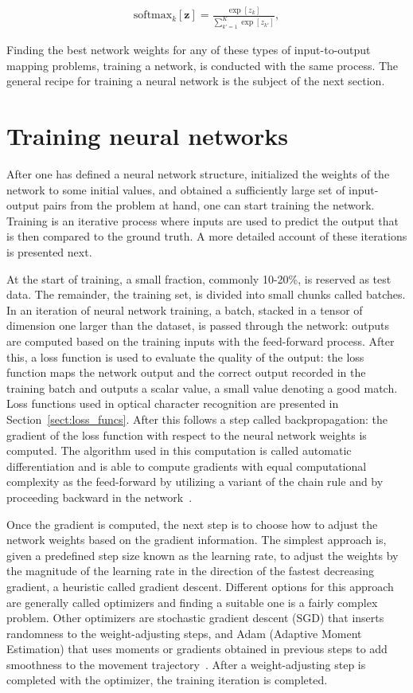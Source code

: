 \documentclass[english,twoside,openright]{UH_DS_MSc}
\begin{document}
\begin{align}
    \text{softmax}_k[\mathbf{z}] = \frac{\exp[z_k]}{\sum_{k'=1}^{K} \exp[z_{k'}]},
    \label{eq:softmax}
\end{align}

Finding the best network weights for any of these types of input-to-output mapping problems, training 
a network, is conducted with the same process.
The general recipe for training a neural network is the subject of the next section.

\section{Training neural networks}
\label{sect:training}

After one has defined a neural network structure, initialized the weights of the network 
to some initial values, and obtained a sufficiently large set of input-output pairs from the problem at hand,
one can start training the network. Training is an iterative process where inputs are used to 
predict the output that is then compared to the ground truth. A more detailed account of these iterations
is presented next.

At the start of training, a small fraction, commonly 10-20\%, is reserved as test data. The remainder, 
the training set, is divided into small chunks called batches.
In an iteration of neural network training, a batch, stacked in a tensor of dimension one larger than the dataset, 
is passed through the network: outputs are computed based on the training inputs with the feed-forward process.
After this, a loss function is used to evaluate the quality of the output: the loss function maps the network output and 
the correct output recorded in the training batch and outputs a scalar value, a small value denoting a good 
match. Loss functions used in optical character recognition are presented in Section~\ref{sect:loss_funcs}.
After this follows a step called backpropagation: the gradient of the loss function with respect 
to the neural network weights is computed. The algorithm used in this computation is called automatic differentiation
and is able to compute gradients with equal computational complexity as the feed-forward by utilizing 
a variant of the chain rule and by proceeding backward in the network~\cite{princebook}.

Once the gradient is computed, the next step is to choose how to adjust the network weights 
based on the gradient information. The simplest approach is, given a predefined step size 
known as the learning rate, to adjust the weights by the magnitude of the learning rate 
in the direction of the fastest decreasing gradient, a heuristic called gradient descent. Different options for this approach 
are generally called optimizers and finding a suitable one is a fairly complex problem.
Other optimizers are stochastic gradient descent (SGD) that inserts randomness 
to the weight-adjusting steps, and Adam (Adaptive Moment Estimation) that 
uses moments or gradients obtained in previous steps to add smoothness to the 
movement trajectory~\cite{princebook}. After a weight-adjusting step is completed 
with the optimizer, the training iteration is completed.
\end{document}
